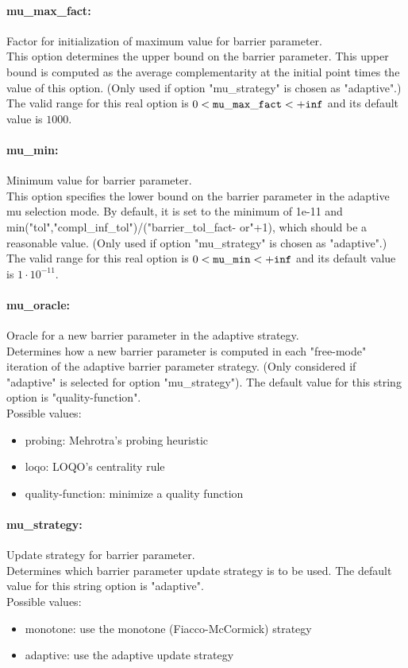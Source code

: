 \paragraph{mu\_max\_fact:}\label{sec:mu_max_fact} Factor for initialization of maximum value for barrier parameter. $\;$ \\
 This option determines the upper bound on the
barrier parameter.  This upper bound is computed
as the average complementarity at the initial
point times the value of this option. (Only used
if option "mu\_strategy" is chosen as "adaptive".) The valid range for this real option is 
$0 <  {\tt mu\_max\_fact } <  {\tt +inf}$
and its default value is $1000$.


\paragraph{mu\_min:}\label{sec:mu_min} Minimum value for barrier parameter. $\;$ \\
 This option specifies the lower bound on the
barrier parameter in the adaptive mu selection
mode. By default, it is set to the minimum of
1e-11 and
min("tol","compl\_inf\_tol")/("barrier\_tol\_fact-
or"+1), which should be a reasonable value. (Only
used if option "mu\_strategy" is chosen as
"adaptive".) The valid range for this real option is 
$0 <  {\tt mu\_min } <  {\tt +inf}$
and its default value is $1 \cdot 10^{-11}$.


\paragraph{mu\_oracle:}\label{sec:mu_oracle} Oracle for a new barrier parameter in the adaptive strategy. $\;$ \\
 Determines how a new barrier parameter is
computed in each "free-mode" iteration of the
adaptive barrier parameter strategy. (Only
considered if "adaptive" is selected for option
"mu\_strategy").
The default value for this string option is "quality-function".
\\ 
Possible values:
\begin{itemize}
   \item probing: Mehrotra's probing heuristic
   \item loqo: LOQO's centrality rule
   \item quality-function: minimize a quality function
\end{itemize}

\paragraph{mu\_strategy:}\label{sec:mu_strategy} Update strategy for barrier parameter. $\;$ \\
 Determines which barrier parameter update
strategy is to be used.
The default value for this string option is "adaptive".
\\ 
Possible values:
\begin{itemize}
   \item monotone: use the monotone (Fiacco-McCormick) strategy
   \item adaptive: use the adaptive update strategy
\end{itemize}


